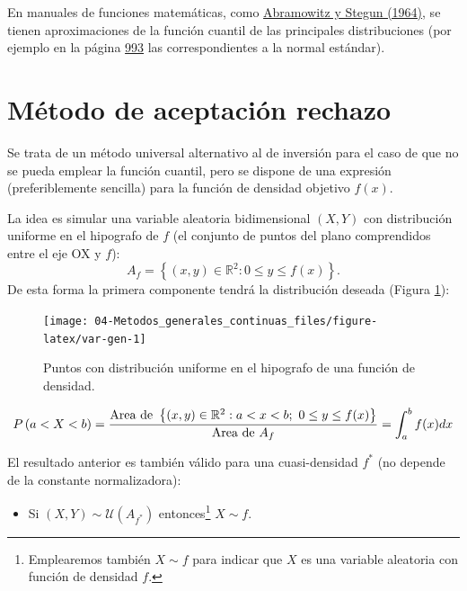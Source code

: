 \documentclass[
]{book}
\providecommand{\tightlist}{%
  \setlength{\itemsep}{0pt}\setlength{\parskip}{0pt}}
\theoremstyle{break}
\theoremstyle{nonumberplain}
\begin{document}
En manuales de funciones matemáticas, como \href{https://www.math.ubc.ca/~cbm/aands/frameindex.htm}{Abramowitz y Stegun (1964)},
se tienen aproximaciones de la función cuantil de las principales distribuciones
(por ejemplo en la página \href{https://www.math.ubc.ca/~cbm/aands/page_933.htm}{993}
las correspondientes a la normal estándar).

\hypertarget{AR}{%
\section{Método de aceptación rechazo}\label{AR}}

Se trata de un método universal alternativo al de inversión para
el caso de que no se pueda emplear la función cuantil,
pero se dispone de una expresión (preferiblemente sencilla) para la
función de densidad objetivo \(f\left( x \right)\).

La idea es simular una variable aleatoria bidimensional \(\left( X, Y\right)\) con distribución uniforme en el hipografo de \(f\) (el conjunto de puntos del plano comprendidos entre el eje OX y \(f\)):
\[A_{f}=\left\{ \left( x,y\right) \in \mathbb{R}^{2}:0\leq y\leq f(x) \right\}.\]
De esta forma la primera componente tendrá la distribución deseada (Figura \ref{fig:var-gen}):

\begin{figure}[!htb]

{\centering \texttt{[image: 04-Metodos\_generales\_continuas\_files/figure-latex/var-gen-1]} 

}

\caption{Puntos con distribución uniforme en el hipografo de una función de densidad.}\label{fig:var-gen}
\end{figure}

\[ P\left( a<X<b\right) = \frac{\text{Area de }\left\{ \left( x,y\right) \in 
\mathbb{R}^{2}:a<x<b;~0\leq y\leq f(x) \right\} }{\text{Area de }
A_{f}} \\
= \int_{a}^{b}f(x) dx \]

El resultado anterior es también válido para una cuasi-densidad \(f^{\ast}\) (no depende de la constante normalizadora):

\begin{itemize}
\tightlist
\item
  Si \(\left( X,Y\right) \sim \mathcal{U}\left(A_{f^{\ast}}\right)\) entonces\footnote{Emplearemos también \(X\sim f\) para indicar que \(X\) es una variable aleatoria con función de densidad \(f\).} \(X\sim f\).
\end{itemize}
\end{document}
